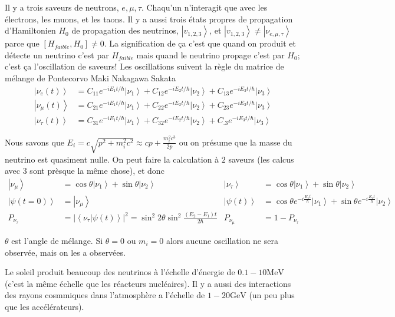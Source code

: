 \documentclass[10pt]{report}
\newcommand{\ket}[1]{\left|#1\right>}
\newcommand{\dotp}[2]{\left<#1\left.\right|#2\right>}
\newcommand{\abs}[1]{\left|#1\right|}
\begin{document}
Il y a trois saveurs de neutrons, $e, \mu, \tau$. Chaqu'un n'interagit que avec les \'electrons, les muons, et les taons. Il y a aussi trois \'etats propres de propagation d'Hamiltonien $H_0$ de propagation des neutrinos, $\ket{v_{1,2,3}}$, et $\ket{v_{1,2,3}} \neq \ket{\nu_{e,\mu,\tau}}$ parce que $\left[H_{faible}, H_0\right] \neq 0$. La signification de \c{c}a c'est que quand on produit et d\'etecte un neutrino c'est par $H_{faible}$ mais quand le neutrino propage c'est par $H_0$; c'est \c{c}a l'oscillation de saveurs! Les oscillations suivent la r\`egle du matrice de m\'elange de Pontecorvo Maki Nakagawa Sakata
\begin{align}
    \ket{\nu_e(t)} &= C_{11} e^{-iE_1t/\hbar}\ket{\nu_1} + C_{12} e^{-iE_2t/\hbar}\ket{\nu_2} + C_{13} e^{-iE_3t/\hbar}\ket{\nu_3}\\
    \ket{\nu_\mu(t)} &= C_{21} e^{-iE_1t/\hbar}\ket{\nu_1} + C_{22} e^{-iE_2t/\hbar}\ket{\nu_2} + C_{23} e^{-iE_3t/\hbar}\ket{\nu_3}\\
    \ket{\nu_\tau(t)} &= C_{31} e^{-iE_1t/\hbar}\ket{\nu_1} + C_{32} e^{-iE_2t/\hbar}\ket{\nu_2} + C_{.3} e^{-iE_3t/\hbar}\ket{\nu_3}
\end{align}

Nous savons que $E_i = c\sqrt{p^2 + m_i^2c^2} \approx cp + \frac{m_i^2c^3}{2p}$ ou on pr\'esume que la masse du neutrino est quasiment nulle. On peut faire la calculation \`a $2$ saveurs (les calcus avec $3$ sont pr\`esque la m\^eme chose), et donc
\begin{align}
    \ket{\nu_\mu} &= \cos\theta \ket{\nu_1} + \sin\theta \ket{\nu_2}&
    \ket{\nu_\tau} &= \cos\theta \ket{\nu_1} + \sin\theta \ket{\nu_2}\\
    \ket{\psi(t=0)} &= \ket{\nu_\mu} & \ket{\psi(t)} &= \cos\theta e^{-i\frac{E_1t}{\hbar}}\ket{\nu_1} + \sin\theta e^{-i\frac{E_2t}{\hbar}}\ket{\nu_2}\\
    P_{\nu_\tau} &= \abs{\dotp{\nu_\tau}{\psi(t)}}^2 = \sin^2 2\theta \sin^2 \frac{(E_2 - E_1)t}{2\hbar} & P_{\nu_\mu} &= 1 - P_{\nu_\tau}
\end{align}

$\theta$ est l'angle de m\'elange. Si $\theta = 0$ ou $m_i = 0$ alors aucune oscillation ne sera observ\'ee, mais on les a observ\'ees. 

Le soleil produit beaucoup des neutrinos \`a l'\'echelle d'\'energie de $0.1 - 10 \mathrm{MeV}$ (c'est la m\^eme \'echelle que les r\'eacteurs nucl\'eaires). Il y a aussi des interactions des rayons cosmmiques dans l'atmosph\`ere a l'\'echelle de $1-20 \mathrm{GeV}$ (un peu plus que les acc\'el\'erateurs). 
\end{document}
